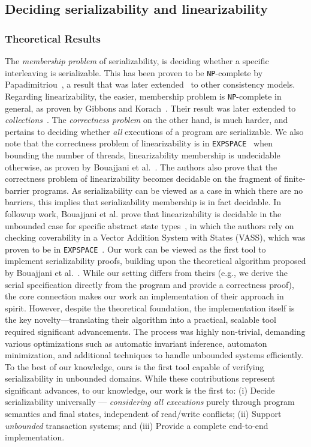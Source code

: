 \subsection{Deciding serializability and linearizability}

\subsubsection{Theoretical Results}
%
The \textit{membership problem} of serializability, is deciding whether a 
specific interleaving is serializable. This has been proven to be 
\texttt{NP}-complete 
by Papadimitriou~\cite{Pa79}, a result that was later extended~\cite{BiEn19} to 
other consistency models.
Regarding linearizability, the easier, membership problem is 
\texttt{NP}-complete in 
general, as proven by Gibbons and Korach~\cite{GiKo97}. Their result was later 
extended to \textit{collections}~\cite{EmEn18}.
%
The \textit{correctness problem} on the other hand, is much harder, and 
pertains to deciding whether \textit{all} executions of a program are 
serializable.
%
We also note that the correctness problem of linearizability is in 
\texttt{EXPSPACE}~\cite{AlMcPe96} when bounding the number of threads, 
linearizability 
membership is undecidable otherwise, as proven by Bouajjani et 
al.~\cite{BoEmEnHa13}. The authors also prove that the correctness problem of 
linearizability becomes decidable on the fragment of finite-barrier programs. 
As serializability can be viewed as a case in which there are no barriers, this 
implies that serializability membership is in fact decidable. 
%
In followup work, Bouajjani et al. prove that linearizability is decidable in 
the unbounded case for specific abstract state types~\cite{BoEmEnHa18}, in 
which the authors rely on checking coverability in a Vector Addition System 
with States (VASS), which was proven to be in \texttt{EXPSPACE}~\cite{Ra78}.
%
Our work can be viewed as the first tool to implement serializability proofs, 
building upon the theoretical algorithm proposed by Bouajjani et 
al.~\cite{BoEmEnHa13}. While our setting differs from theirs (e.g., we derive 
the serial specification directly from the program and provide a correctness 
proof), the core connection makes our work an implementation of their approach 
in spirit. However, despite the theoretical foundation, the implementation 
itself is the key novelty—translating their algorithm into a practical, 
scalable tool required significant advancements. The process was highly 
non-trivial, demanding various optimizations such as automatic invariant 
inference, automaton minimization, and additional techniques to handle 
unbounded systems efficiently. To the best of our knowledge, ours is the first 
tool capable of verifying serializability in unbounded domains.
%
While these contributions represent significant advances, to our knowledge, our 
work is the first to:
(i) Decide serializability universally --- \textit{considering all executions} 
purely through program semantics and final states, independent of read/write 
conflicts; 
(ii) Support \textit{unbounded} transaction systems; and
(iii) Provide a complete end-to-end implementation.



